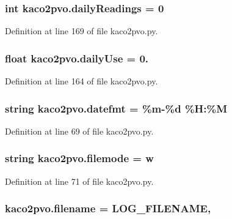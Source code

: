 \subsubsection[{daily\+Readings}]{\setlength{\rightskip}{0pt plus 5cm}int kaco2pvo.\+daily\+Readings = 0}\label{namespacekaco2pvo_ad372d037c3416924e35d0d8b40afa572}


Definition at line 169 of file kaco2pvo.\+py.

\hypertarget{namespacekaco2pvo_a7067b502b347ed0976ff588659da54f3}{}
\subsubsection[{daily\+Use}]{\setlength{\rightskip}{0pt plus 5cm}float kaco2pvo.\+daily\+Use = 0.}\label{namespacekaco2pvo_a7067b502b347ed0976ff588659da54f3}


Definition at line 164 of file kaco2pvo.\+py.

\hypertarget{namespacekaco2pvo_ace25c8f7b6c649306e146a503053eab4}{}
\subsubsection[{datefmt}]{\setlength{\rightskip}{0pt plus 5cm}string kaco2pvo.\+datefmt = \textquotesingle{}\%m-\/\%d \%H\+:\%M\textquotesingle{}}\label{namespacekaco2pvo_ace25c8f7b6c649306e146a503053eab4}


Definition at line 69 of file kaco2pvo.\+py.

\hypertarget{namespacekaco2pvo_ac3aca84da77e325966b4a79a15d4f0bd}{}
\subsubsection[{filemode}]{\setlength{\rightskip}{0pt plus 5cm}string kaco2pvo.\+filemode = \textquotesingle{}w\textquotesingle{}}\label{namespacekaco2pvo_ac3aca84da77e325966b4a79a15d4f0bd}


Definition at line 71 of file kaco2pvo.\+py.

\hypertarget{namespacekaco2pvo_abdd68648081e46aedb256202cc9744c1}{}
\subsubsection[{filename}]{\setlength{\rightskip}{0pt plus 5cm}kaco2pvo.\+filename = {\bf L\+O\+G\+\_\+\+F\+I\+L\+E\+N\+A\+M\+E},}\label{namespacekaco2pvo_abdd68648081e46aedb256202cc9744c1}


